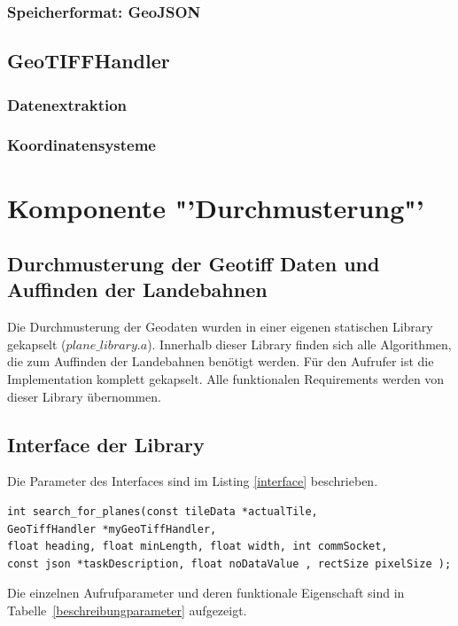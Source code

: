 \documentclass[10pt,a4paper]{report}
\begin{document}
\subsection{Speicherformat: GeoJSON}
\section{GeoTIFFHandler}
\subsection{Datenextraktion}
\subsection{Koordinatensysteme}


\chapter{Komponente "'Durchmusterung"'}
\section{Durchmusterung der Geotiff Daten und Auffinden der Landebahnen}
Die Durchmusterung der Geodaten wurden in einer eigenen statischen Library gekapselt ($plane\_library.a$). Innerhalb dieser Library finden sich alle Algorithmen, die zum Auffinden der Landebahnen benötigt werden. Für den Aufrufer ist die Implementation komplett gekapselt. Alle funktionalen Requirements werden von dieser Library übernommen.


\section{Interface der Library}

Die Parameter des Interfaces sind im Listing \ref{interface} beschrieben.

\begin{lstlisting}[caption=Interface Beschreibung, label=interface]
int search_for_planes(const tileData *actualTile, 
GeoTiffHandler *myGeoTiffHandler, 
float heading, float minLength, float width, int commSocket,
const json *taskDescription, float noDataValue , rectSize pixelSize );
\end{lstlisting}

Die einzelnen Aufrufparameter und deren funktionale Eigenschaft sind in Tabelle~\ref{beschreibungparameter} aufgezeigt.
\end{document}
